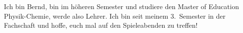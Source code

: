 \begin{multicols*}{2}
{Ich bin Bernd, bin im höheren Semester und studiere den Master of Education Physik-Chemie, werde also Lehrer. Ich bin seit meinem 3.\ Semester in der Fachschaft und hoffe, euch mal auf den Spieleabenden zu treffen!
}


\end{multicols*}

